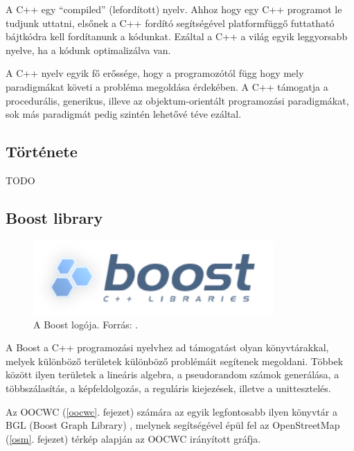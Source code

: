 \documentclass[a4paper,12pt]{report}
\begin{document}
\vspace{2mm}
A C++ egy ``compiled'' (lefordított) nyelv. Ahhoz hogy egy C++ programot le tudjunk uttatni, elsőnek a C++ fordító segítségével platformfüggő futtatható bájtkódra kell fordítanunk a kódunkat. Ezáltal a C++ a világ egyik leggyorsabb nyelve, ha a kódunk optimalizálva van.

A C++ nyelv egyik fő erőssége, hogy a programozótól függ hogy mely paradigmákat követi a probléma megoldása érdekében. A C++ támogatja a procedurális, generikus, illeve az objektum-orientált programozási paradigmákat, sok más paradigmát pedig szintén lehetővé téve ezáltal.



\subsection{Története}
\label{cpphistory}

TODO

\subsection{Boost library}
\label{boost}

\begin{figure}[ht]
\centerline{
\includegraphics[width=3.6in]{img/boost}}
\caption{A Boost logója. Forrás: \cite{boostlogo}.}
\label{boostlogo}
\end{figure}

\vspace{2mm}
A Boost a C++ programozási nyelvhez ad támogatást olyan könyvtárakkal, melyek különböző területek különböző problémáit segítenek megoldani. Többek között ilyen területek a lineáris algebra, a pseudorandom számok generálása, a többszálasítás, a képfeldolgozás, a reguláris kiejezések, illetve a unittesztelés. 

\vspace{2mm}
Az OOCWC (\ref{oocwc}. fejezet) számára az egyik legfontosabb ilyen könyvtár a BGL (Boost Graph Library) \cite{bgl}, melynek segítségével épül fel az OpenStreetMap \cite{osm} (\ref{osm}. fejezet) térkép alapján az OOCWC irányított gráfja.
\end{document}
